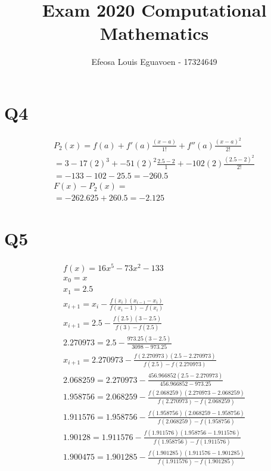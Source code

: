 \documentclass[11pt]{article} %
\title{Exam 2020 Computational Mathematics}
\author{Efeosa Louis Eguavoen - 17324649}
\begin{document}
\maketitle

\section{Q4}
\begin{equation} 
	\begin{split}
P_2(x) = f(a) + f'(a)\frac{(x-a)}{1!} + f''(a)\frac{(x-a)^2}{2!} \\
 = 3-17(2)^3+-51(2)^2\frac{2.5-2}{1}+ -102(2)\frac{(2.5-2)^2}{2!}\\
 =-133-102-25.5 =  -260.5\\
 F(x) - P_2(x)  =\\
=  -262.625 + 260.5 = -2.125
	\end{split}
\end{equation}
\section{Q5}
\begin{equation}
\begin{split}
f(x) = 16x^5 - 73x^2 -133\\
x_0 = x \\ x_1 = 2.5 \\
x_{i+1} = x_i - \frac{f(x_i)(x_{i-1}-x_i)}{f(x_i-1)-f(x_i)}\\
x_{i+1} = 2.5 - \frac{f(2.5)(3-2.5)}{f(3)-f(2.5)}\\
2.270973 = 2.5 - \frac{973.25(3-2.5)}{3098-973.25}\\
x_{i+1} = 2.270973 - \frac{f(2.270973)(2.5-2.270973)}{f(2.5)-f(2.270973)}\\
2.068259 = 2.270973 - \frac{456.966852(2.5-2.270973)}{456.966852-973.25}\\
1.958756 =2.068259 - \frac{f(2.068259)(2.270973-2.068259)}{f(2.270973)-f(2.068259)}\\
1.911576 =1.958756 - \frac{f(1.958756)(2.068259-1.958756)}{f(2.068259)-f(1.958756)}\\
1.90128 =1.911576 - \frac{f(1.911576)(1.958756-1.911576)}{f(1.958756)-f(1.911576)}\\
1.900475 =1.901285 - \frac{f(1.901285)(1.911576-1.901285)}{f(1.911576)-f(1.901285)}\\
\end{split}
\end{equation}
\end{document}
